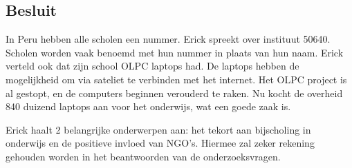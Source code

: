 \subsection{Besluit}
In Peru hebben alle scholen een nummer. Erick spreekt over instituut 50640. Scholen worden vaak benoemd met hun nummer in plaats van hun naam. Erick verteld ook dat zijn school OLPC laptops had. De laptops hebben de mogelijkheid om via sateliet te verbinden met het internet. Het OLPC project is al gestopt, en de computers beginnen verouderd te raken. Nu kocht de overheid 840 duizend laptops aan voor het onderwijs, wat een goede zaak is. \autocite{Riofrio2020}

Erick haalt 2 belangrijke onderwerpen aan: het tekort aan bijscholing in onderwijs en de positieve invloed van NGO's. Hiermee zal zeker rekening gehouden worden in het beantwoorden van de onderzoeksvragen.